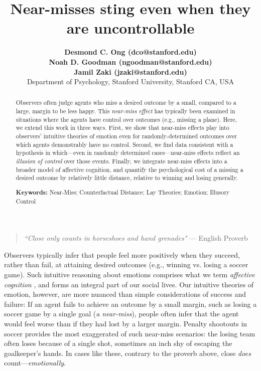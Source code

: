 \documentclass[10pt,letterpaper]{article}
\title{ Near-misses sting even when they are uncontrollable }
\author{{\large \bf Desmond C. Ong (dco@stanford.edu)} \\
{\large \bf Noah D. Goodman (ngoodman@stanford.edu)} \\
{\large \bf Jamil Zaki (jzaki@stanford.edu)} \\
  Department of Psychology, Stanford University, Stanford CA, USA 
}
\begin{document}
\maketitle

\begin{abstract}
Observers often judge agents who miss a desired outcome by a small, compared to a large, margin to be less happy. This \textit{near-miss effect} has typically been examined in situations where the agents have control over outcomes (e.g., missing a plane). Here, we extend this work in three ways.  First, we show that near-miss effects play into observers' intuitive theories of emotion even for randomly-determined outcomes over which agents demonstrably have no control.  Second, we find data consistent with a hypothesis in which---even in randomly determined cases---near-miss effects reflect an \textit{illusion of control} over those events. Finally, we integrate near-miss effects into a broader model of affective cognition, and quantify the psychological cost of a missing a desired outcome by relatively little distance, relative to winning and losing generally.

\textbf{Keywords:} 
Near-Miss; Counterfactual Distance; Lay Theories; Emotion; Illusory Control
\end{abstract}


\begin{quote}
\textit{``Close only counts in horseshoes and hand grenades"} 
--- English Proverb
\end{quote}


	Observers typically infer that people feel more positively when they succeed, rather than fail, at attaining desired outcomes (e.g., winning vs. losing a soccer game). Such intuitive reasoning about emotions comprises what we term \textit{affective cognition} \cite{OngAffCog}, and forms an integral part of our social lives. Our intuitive theories of emotion, however, are more nuanced than simple considerations of success and failure: If an agent fails to achieve an outcome by a small margin, such as losing a soccer game by a single goal (\textit{a near-miss}), people often infer that the agent would feel worse than if they had lost by a larger margin. Penalty shootouts in soccer provides the most exaggerated of such near-miss scenarios: the losing team often loses because of a single shot, sometimes an inch shy of escaping the goalkeeper's hands. In cases like these, contrary to the proverb above, close \textit{does} count---\textit{emotionally}.
\end{document}
